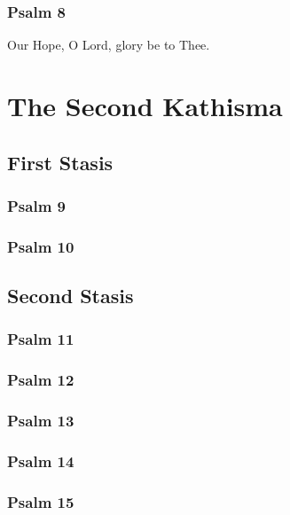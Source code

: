 \documentclass[12pt]{book}
\newcommand{\kathismabreak}{
  \medskip
  \begin{center}
  \begin{footnotesize}
  

  

  

  
  \end{footnotesize}
  \end{center}
  \smallbreak
}
\newcommand{\kathismaend}{
  \medskip
  \begin{center}
  \begin{footnotesize}
  

  

  Our Hope, O Lord, glory be to Thee.
  \end{footnotesize}
  \end{center}
  \smallbreak
}
\begin{document}
\subsubsection{Psalm 8}


\kathismaend

\section{The Second Kathisma}

\subsection{First Stasis}

\subsubsection{Psalm 9}


\subsubsection{Psalm 10}


\kathismabreak

\subsection{Second Stasis}

\subsubsection{Psalm 11}


\subsubsection{Psalm 12}


\subsubsection{Psalm 13}


\kathismabreak

\subsubsection{Psalm 14}


\subsubsection{Psalm 15}

\end{document}
